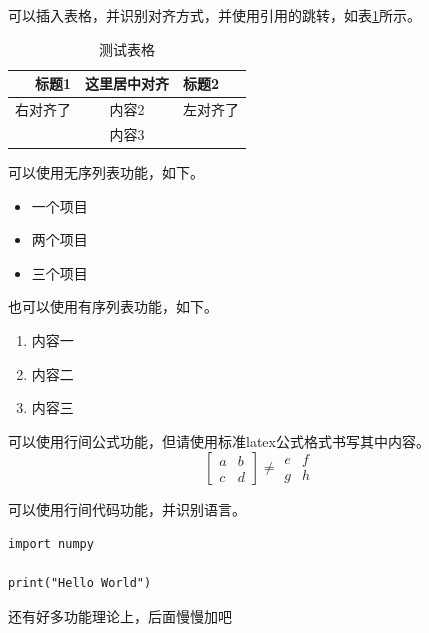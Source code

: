 \documentclass{ctexart} %
\begin{document}
\par 可以插入表格，并识别对齐方式，并使用引用的跳转，如表\ref{tab1}所示。

\begin{table}[ht]
    \centering
    \caption{测试表格}
    \begin{tabular}{rcl}
        \toprule
        \textbf{标题1}&\textbf{这里居中对齐}&\textbf{标题2} \\
        \midrule
          右对齐了  &     内容2      &  左对齐了   \\
                    &     内容3      &             \\
        \bottomrule
    \end{tabular}
    \label{tab1}
\end{table}

\par 可以使用无序列表功能，如下。

\begin{itemize}
    \item 一个项目
    \item 两个项目
    \item 三个项目

\end{itemize}
\par 也可以使用有序列表功能，如下。

\begin{enumerate}
    \item 内容一
    \item 内容二
    \item 内容三

\end{enumerate}
\par 可以使用行间公式功能，但请使用标准latex公式格式书写其中内容。
\begin{equation}
\begin{bmatrix}
a & b \\ c & d
\end{bmatrix}
\neq
\begin{matrix}
e & f \\ g & h
\end{matrix}
\end{equation}
\par 可以使用行间代码功能，并识别语言。

\begin{verbatim}
import numpy

print("Hello World")
\end{verbatim}

\par 还有好多功能理论上，后面慢慢加吧




\clearpage

\end{document}
